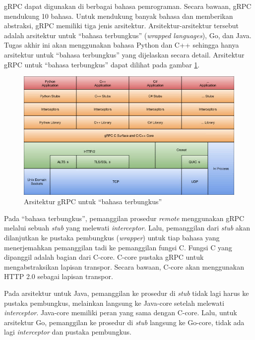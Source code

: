 gRPC dapat digunakan di berbagai bahasa pemrograman. Secara bawaan, gRPC
mendukung 10 bahasa. Untuk mendukung banyak bahasa dan memberikan abstraksi,
gRPC memiliki tiga jenis arsitektur. Arsitektur-arsitektur tersebut adalah
arsitektur untuk ``bahasa terbungkus'' (\textit{wrapped languages}), Go, dan
Java. Tugas akhir ini akan menggunakan bahasa Python dan C++ sehingga hanya
arsitektur untuk ``bahasa terbungkus'' yang dijelaskan secara detail. Arsitektur
gRPC untuk ``bahasa terbungkus'' dapat dilihat pada gambar
\ref{chapter-2-grpc-stack}.

\begin{figure}
    \centering
    \includegraphics[width=1.0\textwidth]{resources/chapter-2/grpc-arch.jpeg}
    \caption{Arsitektur gRPC untuk ``bahasa terbungkus''
        \parencite{mastrangelo_grpcStack}}
    \label{chapter-2-grpc-stack}
\end{figure}

Pada ``bahasa terbungkus'', pemanggilan prosedur \textit{remote} menggunakan
gRPC me\-la\-lu\-i sebuah \textit{stub} yang me\-le\-wa\-ti
\textit{interceptor}. Lalu, pemanggilan dari \textit{stub} akan dilanjutkan ke
pustaka pembungkus (\textit{wrapper}) untuk tiap bahasa yang
me\-ner\-je\-mah\-kan pemanggilan tadi ke pemanggilan fungsi C. Fungsi C yang
dipanggil adalah bagian dari C-core. C-core pustaka gRPC untuk mengabstraksikan
lapisan transpor. Secara bawaan, C-core akan menggunakan HTTP 2.0 sebagai
lapisan transpor.

Pada arsitektur untuk Java, pemanggilan ke prosedur di \textit{stub} tidak lagi
harus ke pustaka pembungkus, melainkan langsung ke Java-core setelah melewati
\textit{interceptor}. Java-core memiliki peran yang sama dengan C-core. Lalu,
untuk arsitektur Go, pemanggilan ke prosedur di \textit{stub} langsung ke
Go-core, tidak ada lagi \textit{interceptor} dan pustaka pembungkus.

